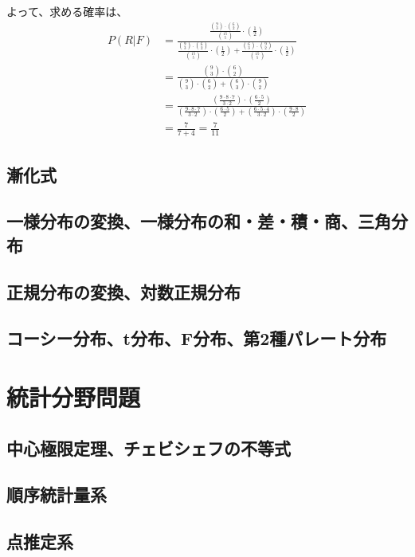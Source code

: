 \documentclass{jsbook}
\begin{document}
よって、求める確率は、
\begin{equation}
\begin{split}
P(R|F)& = \frac{\frac{\binom{9}{3}\cdot\binom{6}{2}}{\binom{15}{5}}\cdot(\frac{1}{2})}{\frac{\binom{9}{3}\cdot\binom{6}{2}}{\binom{15}{5}}\cdot(\frac{1}{2}) + \frac{\binom{6}{3}\cdot\binom{9}{2}}{\binom{15}{5}}\cdot(\frac{1}{2})} \\
&=\frac{\binom{9}{3}\cdot\binom{6}{2}}{\binom{9}{3}\cdot\binom{6}{2} + \binom{6}{3}\cdot\binom{9}{2}} \\
&=\frac{(\frac{9\cdot8\cdot7}{3\cdot2})\cdot(\frac{6\cdot5}{2})}{(\frac{9\cdot8\cdot7}{3\cdot2})\cdot(\frac{6\cdot5}{2}) + (\frac{6\cdot5\cdot4}{3\cdot2})\cdot(\frac{9\cdot8}{2})} \\
&=\frac{7}{7 + 4} = \frac{7}{11}
\end{split}
\end{equation}

\newpage
\section{漸化式}
\newpage
\section{一様分布の変換、一様分布の和・差・積・商、三角分布}
\newpage
\section{正規分布の変換、対数正規分布}
\newpage
\section{コーシー分布、t分布、F分布、第2種パレート分布}

\chapter{統計分野問題}
\section{中心極限定理、チェビシェフの不等式}
\newpage
\section{順序統計量系}
\newpage
\section{点推定系}
\newpage
\end{document}

